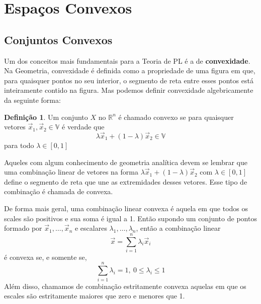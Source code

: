 \theoremstyle{definition}

\newtheorem{def:conjunto convexo}{Definição}[chapter]

\newtheorem{def:politopo}[def:conjunto convexo]{Definição}

\newtheorem{def:poliedro convexo}[def:conjunto convexo]{Definição}

\newtheorem{def:cone}[def:conjunto convexo]{Definição}

\newtheorem{def:cone hull}[def:conjunto convexo]{Definição}

\newtheorem{def:cone convexo}[def:conjunto convexo]{Definição}

\newtheorem{def:cpc}[def:conjunto convexo]{Definição}

\section{Espaços Convexos}

\subsection{Conjuntos Convexos}

Um dos conceitos mais fundamentais para a Teoria de PL é a de \textbf{convexidade}.
Na Geometria, convexidade é definida como a propriedade de uma figura em que,
para quaisquer pontos no seu interior, o segmento de reta entre esses pontos
está inteiramente contido na figura. Mas podemos definir convexidade algebricamente
da seguinte forma:

\begin{def:conjunto convexo}
	\label{def:conjunto convexo}
	Um conjunto $X$ no $\mathbb{R}^n$ é chamado convexo se para quaisquer
	vetores $\vec x_1, \vec x_2 \in \mathbb{V}$ é verdade que
	\[\lambda \vec x_1 + (1 - \lambda)\vec x_2 \in \mathbb{V}\]
	para todo $\lambda \in [0, 1]$
\end{def:conjunto convexo}

Aqueles com algum conhecimento de geometria analítica devem se lembrar que uma
combinação linear de vetores na forma $\lambda \vec x_1 + (1 - \lambda)\vec x_2$
com $\lambda \in [0, 1]$ define o segmento de reta que une as extremidades desses
vetores. Esse tipo de combinação é chamada de convexa.

De forma mais geral, uma combinação linear convexa é aquela em que todos os
scales são positivos e sua soma é igual a 1. Então supondo um conjunto de pontos
formado por $\vec x_1, \ldots, \vec x_n$ e escalares $\lambda_1, \ldots, \lambda_n$,
então a combinação linear
\[\vec x = \sum_{i=1}^{n} \lambda_i \vec x_i\] é convexa se, e somente se,
\[\sum_{i=1}^{n} \lambda_i = 1,\ 0 \leq \lambda_i \leq 1\]
Além disso, chamamos de combinação estritamente convexa aquelas em que os escales
são estritamente maiores que zero e menores que 1.

